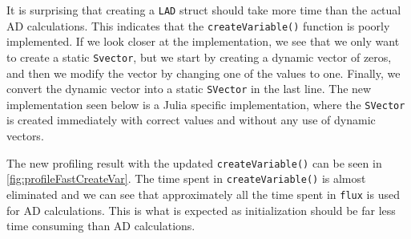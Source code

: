 It is surprising that creating a \texttt{LAD} struct should take more time than the actual AD calculations. This indicates that the \texttt{createVariable()} function is poorly implemented. If we look closer at the implementation, we see that we only want to create a static \texttt{Svector}, but we start by creating a dynamic vector of zeros, and then we modify the vector by changing one of the values to one. Finally, we convert the dynamic vector into a static \texttt{SVector} in the last line. The new implementation seen below is a Julia specific implementation, where the \texttt{SVector} is created immediately with correct values and without any use of dynamic vectors.

The new profiling result with the updated \texttt{createVariable()} can be seen in \autoref{fig:profileFastCreateVar}. The time spent in \texttt{createVariable()} is almost eliminated and we can see that approximately all the time spent in \texttt{flux} is used for AD calculations. This is what is expected as initialization should be far less time consuming than AD calculations. 

